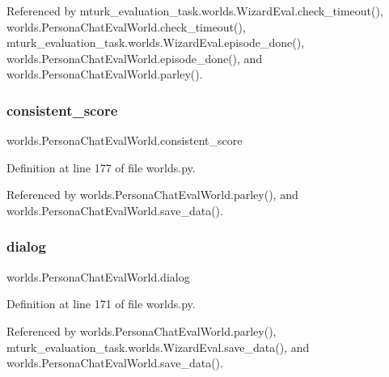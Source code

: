 Referenced by mturk\+\_\+evaluation\+\_\+task.\+worlds.\+Wizard\+Eval.\+check\+\_\+timeout(), worlds.\+Persona\+Chat\+Eval\+World.\+check\+\_\+timeout(), mturk\+\_\+evaluation\+\_\+task.\+worlds.\+Wizard\+Eval.\+episode\+\_\+done(), worlds.\+Persona\+Chat\+Eval\+World.\+episode\+\_\+done(), and worlds.\+Persona\+Chat\+Eval\+World.\+parley().

\mbox{\label{classworlds_1_1PersonaChatEvalWorld_a2826d2e51ec376fb8e1a90810f32f67d}} 
\subsubsection{\texorpdfstring{consistent\+\_\+score}{consistent\_score}}
{\footnotesize\ttfamily worlds.\+Persona\+Chat\+Eval\+World.\+consistent\+\_\+score}



Definition at line 177 of file worlds.\+py.



Referenced by worlds.\+Persona\+Chat\+Eval\+World.\+parley(), and worlds.\+Persona\+Chat\+Eval\+World.\+save\+\_\+data().

\mbox{\label{classworlds_1_1PersonaChatEvalWorld_a3a839359e827a16d25daf577234cc35b}} 
\subsubsection{\texorpdfstring{dialog}{dialog}}
{\footnotesize\ttfamily worlds.\+Persona\+Chat\+Eval\+World.\+dialog}



Definition at line 171 of file worlds.\+py.



Referenced by worlds.\+Persona\+Chat\+Eval\+World.\+parley(), mturk\+\_\+evaluation\+\_\+task.\+worlds.\+Wizard\+Eval.\+save\+\_\+data(), and worlds.\+Persona\+Chat\+Eval\+World.\+save\+\_\+data().

